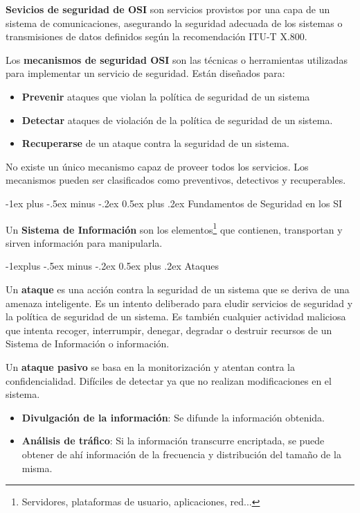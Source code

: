 \documentclass[10pt,portrait, twocolumn]{article}
\makeatletter
\renewcommand{\section}{\@startsection{section}{1}{0mm}%
                                {-1ex plus -.5ex minus -.2ex}%
                                {0.5ex plus .2ex}%
                                {\normalfont\large\bfseries}}
\renewcommand{\subsection}{\@startsection{subsection}{2}{0mm}%
                                {-1explus -.5ex minus -.2ex}%
                                {0.5ex plus .2ex}%
                                {\normalfont\normalsize\bfseries}}
\makeatother
\begin{document}
\textbf{Sevicios de seguridad de OSI} son servicios provistos por una capa de un sistema de comunicaciones, asegurando la seguridad adecuada de los sistemas o transmisiones de datos definidos según la recomendación ITU-T X.800.

\quad Los \textbf{mecanismos de seguridad OSI} son las técnicas o herramientas utilizadas para implementar un servicio de seguridad. Están diseñados para:

	\begin{itemize}
		\item \textbf{Prevenir} ataques que violan la política de seguridad de un sistema
		\item \textbf{Detectar} ataques de violación de la política de seguridad de un sistema.
		\item \textbf{Recuperarse} de un ataque contra la seguridad de un sistema.
	\end{itemize}
	
No existe un único mecanismo capaz de proveer todos los servicios. Los mecanismos pueden ser clasificados como preventivos, detectivos y recuperables.

\section{Fundamentos de Seguridad en los SI}

Un \textbf{Sistema de Información} son los elementos\footnote{Servidores, plataformas de usuario, aplicaciones, red...} que contienen, transportan y sirven información para manipularla.

\subsection{Ataques}
	
Un \textbf{ataque} es una acción contra la seguridad de un sistema que se deriva de una amenaza inteligente. Es un intento deliberado para eludir servicios de seguridad y la política de seguridad de un sistema. Es también cualquier actividad maliciosa que intenta recoger, interrumpir, denegar, degradar o destruir recursos de un Sistema de Información o información. 
	
\quad Un \textbf{ataque pasivo} se basa en la monitorización y atentan contra la confidencialidad. Difíciles de detectar ya que no realizan modificaciones en el sistema.
	
	\begin{itemize}
		\item \textbf{Divulgación de la información}: Se difunde la información obtenida.
		\item \textbf{Análisis de tráfico}: Si la información transcurre encriptada, se puede obtener de ahí información de la frecuencia y distribución del tamaño de la misma.
	\end{itemize}
	
\end{document}
